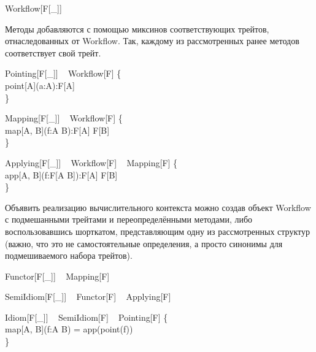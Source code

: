 \begin{haskell}
 Workflow[F[\_]] \\
\end{haskell}

Методы добавляются с помощью миксинов соответствующих трейтов, отнаследованных от \<Workflow\>. Так, каждому из рассмотренных ранее методов соответствует свой трейт.

\begin{haskell}
 Pointing[F[\_]] ~ Workflow[F] \{ \\
\quad\quad {} point[A](a:A):F[A] \\
\} \\
\end{haskell}

\begin{haskell}
 Mapping[F[\_]] ~ Workflow[F] \{ \\
\quad\quad {} map[A, B](f:A \Rightarrow B):F[A] \Rightarrow F[B] \\
\} \\
\end{haskell}

\begin{haskell}
 Applying[F[\_]] ~ Workflow[F] ~ Mapping[F] \{ \\
\quad\quad {} app[A, B](f:F[A \Rightarrow B]):F[A] \Rightarrow F[B] \\
\} \\
\end{haskell}

Объявить реализацию вычислительного контекста можно создав объект \<Workflow\> с подмешанными трейтами и переопределёнными методами, либо воспользовавшись шорткатом, представляющим одну из рассмотренных структур (важно, что это не самостоятельные определения, а просто синонимы для подмешиваемого набора трейтов).

\begin{haskell}
 Functor[F[\_]] ~ Mapping[F]
\end{haskell}

\begin{haskell}
 SemiIdiom[F[\_]] ~ Functor[F] ~ Applying[F]
\end{haskell}

\begin{haskell}
 Idiom[F[\_]] ~ SemiIdiom[F] ~ Pointing[F] \{\\
\quad\quad {} map[A, B](f:A \Rightarrow B) = app(point(f))\\
\}
\end{haskell}

